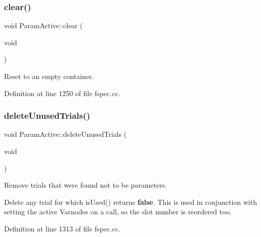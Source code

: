 \subsubsection{\texorpdfstring{clear()}{clear()}}
{\footnotesize\ttfamily void Param\+Active\+::clear (\begin{DoxyParamCaption}\item[{void}]{ }\end{DoxyParamCaption})}



Reset to an empty container. 



Definition at line 1250 of file fspec.\+cc.

\mbox{\label{class_param_active_a23ffb29ecb4569901e136929a50ac6b2}} 
\subsubsection{\texorpdfstring{deleteUnusedTrials()}{deleteUnusedTrials()}}
{\footnotesize\ttfamily void Param\+Active\+::delete\+Unused\+Trials (\begin{DoxyParamCaption}\item[{void}]{ }\end{DoxyParamCaption})}



Remove trials that were found not to be parameters. 

Delete any trial for which is\+Used() returns {\bfseries{false}}. This is used in conjunction with setting the active Varnodes on a call, so the slot number is reordered too. 

Definition at line 1313 of file fspec.\+cc.

